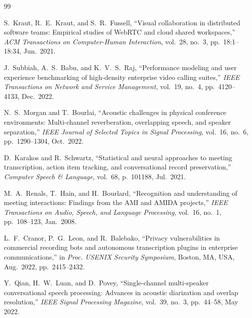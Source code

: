 \documentclass[12pt,oneside,letterpaper]{report}
\numberwithin{equation}{chapter} %
\begin{document}
\newpage
\begin{singlespace}
\begin{thebibliography}{99}

S.~Kraut, R.~E.~Kraut, and S.~R.~Fussell, ``Visual collaboration in distributed software teams: Empirical studies of WebRTC and cloud shared workspaces,'' \emph{ACM Transactions on Computer-Human Interaction}, vol.~28, no.~3, pp.~18:1--18:34, Jun.~2021.

J.~Subbiah, A.~S.~Babu, and K.~V.~S.~Raj, ``Performance modeling and user experience benchmarking of high-density enterprise video calling suites,'' \emph{IEEE Transactions on Network and Service Management}, vol.~19, no.~4, pp.~4120--4133, Dec.~2022.

N.~S.~Morgan and T.~Bourlai, ``Acoustic challenges in physical conference environments: Multi-channel reverberation, overlapping speech, and speaker separation,'' \emph{IEEE Journal of Selected Topics in Signal Processing}, vol.~16, no.~6, pp.~1290--1304, Oct.~2022.

D.~Karakos and R.~Schwartz, ``Statistical and neural approaches to meeting transcription, action item tracking, and conversational record preservation,'' \emph{Computer Speech \& Language}, vol.~68, p.~101188, Jul.~2021.

M.~A.~Renals, T.~Hain, and H.~Bourlard, ``Recognition and understanding of meeting interactions: Findings from the AMI and AMIDA projects,'' \emph{IEEE Transactions on Audio, Speech, and Language Processing}, vol.~16, no.~1, pp.~108--123, Jan.~2008.

L.~F.~Cranor, P.~G.~Leon, and R.~Balebako, ``Privacy vulnerabilities in commercial recording bots and autonomous transcription plugins in enterprise communications,'' in \emph{Proc. USENIX Security Symposium}, Boston, MA, USA, Aug.~2022, pp.~2415--2432.

Y.~Qian, H.~W.~Luan, and D.~Povey, ``Single-channel multi-speaker conversational speech processing: Advances in acoustic diarization and overlap resolution,'' \emph{IEEE Signal Processing Magazine}, vol.~39, no.~3, pp.~44--58, May 2022.


\end{thebibliography}
\end{singlespace}
\end{document}
